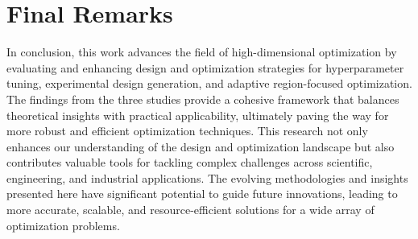 \section{Final Remarks}

In conclusion, this work advances the field of high-dimensional optimization by evaluating and enhancing design and optimization strategies for hyperparameter tuning, experimental design generation, and adaptive region-focused optimization. The findings from the three studies provide a cohesive framework that balances theoretical insights with practical applicability, ultimately paving the way for more robust and efficient optimization techniques. This research not only enhances our understanding of the design and optimization landscape but also contributes valuable tools for tackling complex challenges across scientific, engineering, and industrial applications. The evolving methodologies and insights presented here have significant potential to guide future innovations, leading to more accurate, scalable, and resource-efficient solutions for a wide array of optimization problems.

\pagebreak
